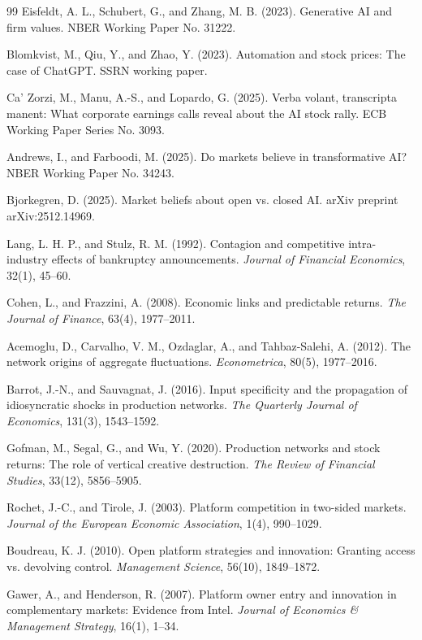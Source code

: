 \documentclass[11pt,fontset=fandol,a4paper]{ctexart}
\begin{document}
\begin{thebibliography}{99}
Eisfeldt, A. L., Schubert, G., and Zhang, M. B. (2023).
Generative AI and firm values.
NBER Working Paper No. 31222.

Blomkvist, M., Qiu, Y., and Zhao, Y. (2023).
Automation and stock prices: The case of ChatGPT.
SSRN working paper.

Ca' Zorzi, M., Manu, A.-S., and Lopardo, G. (2025).
Verba volant, transcripta manent: What corporate earnings calls reveal about the AI stock rally.
ECB Working Paper Series No. 3093.

Andrews, I., and Farboodi, M. (2025).
Do markets believe in transformative AI?
NBER Working Paper No. 34243.

Bjorkegren, D. (2025).
Market beliefs about open vs. closed AI.
arXiv preprint arXiv:2512.14969.

Lang, L. H. P., and Stulz, R. M. (1992).
Contagion and competitive intra-industry effects of bankruptcy announcements.
\textit{Journal of Financial Economics}, 32(1), 45--60.

Cohen, L., and Frazzini, A. (2008).
Economic links and predictable returns.
\textit{The Journal of Finance}, 63(4), 1977--2011.

Acemoglu, D., Carvalho, V. M., Ozdaglar, A., and Tahbaz-Salehi, A. (2012).
The network origins of aggregate fluctuations.
\textit{Econometrica}, 80(5), 1977--2016.

Barrot, J.-N., and Sauvagnat, J. (2016).
Input specificity and the propagation of idiosyncratic shocks in production networks.
\textit{The Quarterly Journal of Economics}, 131(3), 1543--1592.

Gofman, M., Segal, G., and Wu, Y. (2020).
Production networks and stock returns: The role of vertical creative destruction.
\textit{The Review of Financial Studies}, 33(12), 5856--5905.

Rochet, J.-C., and Tirole, J. (2003).
Platform competition in two-sided markets.
\textit{Journal of the European Economic Association}, 1(4), 990--1029.

Boudreau, K. J. (2010).
Open platform strategies and innovation: Granting access vs. devolving control.
\textit{Management Science}, 56(10), 1849--1872.

Gawer, A., and Henderson, R. (2007).
Platform owner entry and innovation in complementary markets: Evidence from Intel.
\textit{Journal of Economics \& Management Strategy}, 16(1), 1--34.


\end{thebibliography}
\end{document}
